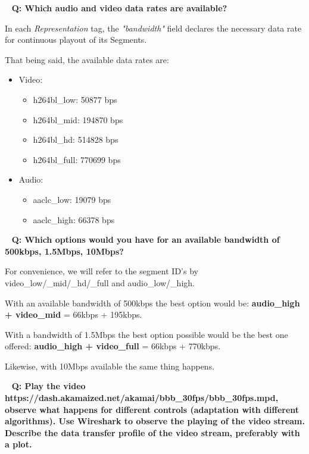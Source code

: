 \documentclass{article}
\newcommand{\Question}[1]{\textbf{Q: #1}}
\begin{document}
~\newline  
\Question{Which audio and video data rates are available?}

In each \textit{Representation} tag, the \textit{"bandwidth"} field declares the
necessary data rate for continuous playout of its Segments.

That being said, the available data rates are:
\begin{itemize}
    \item Video:
        \begin{itemize}
            \item h264bl\_low: 50877 bps
            \item h264bl\_mid: 194870 bps
            \item h264bl\_hd: 514828 bps
            \item h264bl\_full: 770699 bps
        \end{itemize}
    \item Audio:
        \begin{itemize}
            \item aaclc\_low: 19079 bps
            \item aaclc\_high: 66378 bps
        \end{itemize}
\end{itemize}

~\newline  
\Question{Which options would you have for an available bandwidth of 500kbps, 1.5Mbps, 10Mbps?}

For convenience, we will refer to the segment ID's by 
video\_low/\_mid/\_hd/\_full and audio\_low/\_high.
~\newline

With an available bandwidth of 500kbps the best option would be:
\textbf{audio\_high + video\_mid} = 66kbps + 195kbps.


With a bandwidth of 1.5Mbps the best option possible would be the best one 
offered:
\textbf{audio\_high + video\_full} = 66kbps + 770kbps.

Likewise, with 10Mbps available the same thing happens.


~\newline
\Question{Play the video 
https://dash.akamaized.net/akamai/bbb\_30fps/bbb\_30fps.mpd, observe what happens for different controls (adaptation with different algorithms).
Use Wireshark to observe the playing of the video stream.
Describe the data transfer profile of the video stream, preferably 
with a plot.}
\end{document}
